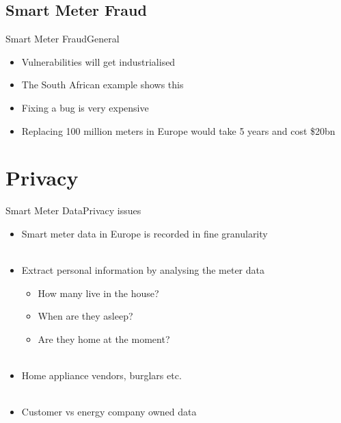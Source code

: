 \documentclass[10pt]{beamer}
\begin{document}
\subsection{Smart Meter Fraud}
\begin{frame}{Smart Meter Fraud}{General}
	\begin{itemize}
		\item Vulnerabilities will get industrialised
		\item The South African example shows this 
		\item Fixing a bug is very expensive
		\item Replacing 100 million meters in Europe would take 5 years and cost \$20bn
	\end{itemize}
\end{frame}

\section{Privacy}
\begin{frame}{Smart Meter Data}{Privacy issues}
	\begin{itemize}
		\item Smart meter data in Europe is recorded in fine granularity
		\\~\\
		\item Extract personal information by analysing the meter data
		\begin{itemize}
			\item How many live in the house?
			
			\item When are they asleep?
			\item Are they home at the moment?
		\\~\\	
		\end{itemize}
		\item Home appliance vendors, burglars etc.
		\\~\\
		\item Customer vs energy company owned data
	\end{itemize}
\end{frame}
\end{document}
